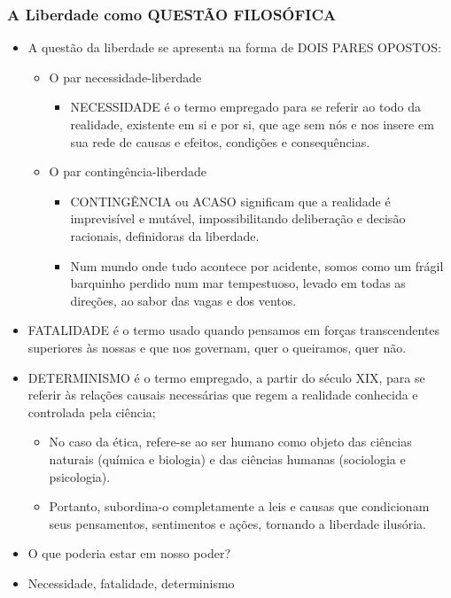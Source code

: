 \documentclass[
]{book}
\providecommand{\tightlist}{%
  \setlength{\itemsep}{0pt}\setlength{\parskip}{0pt}}
\begin{document}
\hypertarget{a-liberdade-como-questuxe3o-filosuxf3fica}{%
\subsubsection{A Liberdade como QUESTÃO FILOSÓFICA}\label{a-liberdade-como-questuxe3o-filosuxf3fica}}

\begin{itemize}
\tightlist
\item
  A questão da liberdade se apresenta na forma de DOIS PARES OPOSTOS:

  \begin{itemize}
  \tightlist
  \item
    O par necessidade-liberdade

    \begin{itemize}
    \tightlist
    \item
      NECESSIDADE é o termo empregado para se referir ao todo da realidade, existente em si e por si, que age sem nós e nos insere em sua rede de causas e efeitos, condições e consequências.
    \end{itemize}
  \item
    O par contingência-liberdade

    \begin{itemize}
    \tightlist
    \item
      CONTINGÊNCIA ou ACASO significam que a realidade é imprevisível e mutável, impossibilitando deliberação e decisão racionais, definidoras da liberdade.
    \item
      Num mundo onde tudo acontece por acidente, somos como um frágil barquinho perdido num mar tempestuoso, levado em todas as direções, ao sabor das vagas e dos ventos.
    \end{itemize}
  \end{itemize}
\item
  FATALIDADE é o termo usado quando pensamos em forças transcendentes superiores às nossas e que nos governam, quer o queiramos, quer não.
\item
  DETERMINISMO é o termo empregado, a partir do século XIX, para se referir às relações causais necessárias que regem a realidade conhecida e controlada pela ciência;

  \begin{itemize}
  \tightlist
  \item
    No caso da ética, refere-se ao ser humano como objeto das ciências naturais (química e biologia) e das ciências humanas (sociologia e psicologia).
  \item
    Portanto, subordina-o completamente a leis e causas que condicionam seus pensamentos, sentimentos e ações, tornando a liberdade ilusória.
  \end{itemize}
\item
  O que poderia estar em nosso poder?
\item
  Necessidade, fatalidade, determinismo


\end{itemize}
\end{document}
